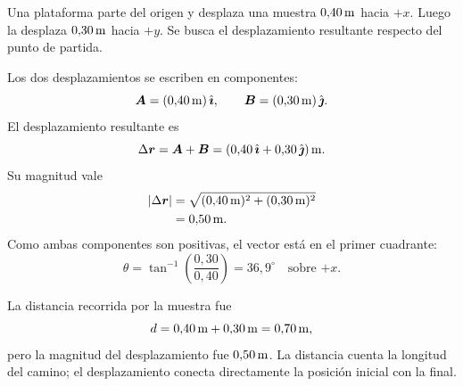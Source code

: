 \documentclass[11pt]{article}
\begin{document}
Una plataforma parte del origen y desplaza una muestra
\(0{,}40\,\mathrm{m}\) hacia \(+x\). Luego la desplaza
\(0{,}30\,\mathrm{m}\) hacia \(+y\). Se busca el desplazamiento resultante
respecto del punto de partida.

\begin{center}
\end{center}

Los dos desplazamientos se escriben en componentes:
\[
  \boldsymbol{A}
  =(0{,}40\,\mathrm{m})\,\hat{\boldsymbol{\imath}},
  \qquad
  \boldsymbol{B}
  =(0{,}30\,\mathrm{m})\,\hat{\boldsymbol{\jmath}}.
\]
El desplazamiento resultante es
\[
  \Delta\boldsymbol{r}
  =\boldsymbol{A}+\boldsymbol{B}
  =(0{,}40\,\hat{\boldsymbol{\imath}}+0{,}30\,\hat{\boldsymbol{\jmath}})\,\mathrm{m}.
\]
Su magnitud vale
\begin{align*}
  |\Delta\boldsymbol{r}|
  &=
  \sqrt{(0{,}40\,\mathrm{m})^2+(0{,}30\,\mathrm{m})^2}
  \\
  &=0{,}50\,\mathrm{m}.
\end{align*}
Como ambas componentes son positivas, el vector está en el primer cuadrante:
\[
  \theta
  =
  \tan^{-1}\left(\frac{0{,}30}{0{,}40}\right)
  =36{,}9^\circ
  \quad\text{sobre \(+x\)}.
\]



La distancia recorrida por la muestra fue
\[
  d=0{,}40\,\mathrm{m}+0{,}30\,\mathrm{m}
  =0{,}70\,\mathrm{m},
\]
pero la magnitud del desplazamiento fue \(0{,}50\,\mathrm{m}\). La distancia
cuenta la longitud del camino; el desplazamiento conecta directamente la
posición inicial con la final.
\end{document}
